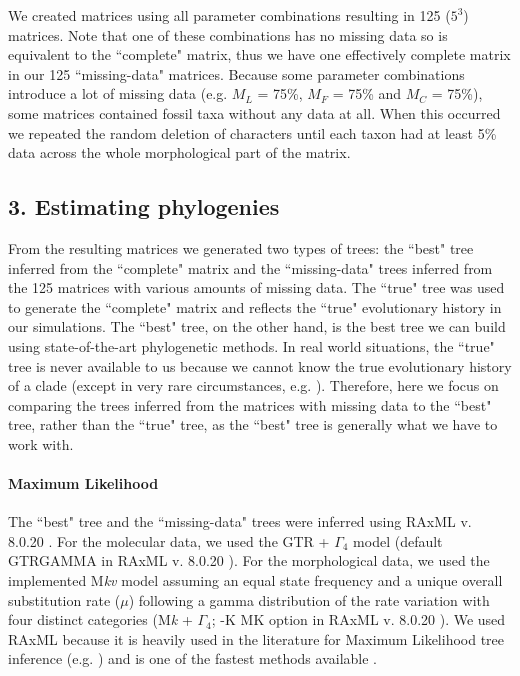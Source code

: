 \documentclass[10pt,letterpaper]{article}
\begin{document}
We created matrices using all parameter combinations resulting in 125 ($5^3$) matrices. Note that one of these combinations has no missing data so is equivalent to the ``complete" matrix, thus we have one effectively complete matrix in our 125 ``missing-data" matrices. Because some parameter combinations introduce a lot of missing data (e.g. $M_L$ = 75\%, $M_F$ = 75\% and $M_C$ = 75\%), some matrices contained fossil taxa without any data at all. When this occurred we repeated the random deletion of characters until each taxon had at least 5\% data across the whole morphological part of the matrix.


\subsection*{3. Estimating phylogenies}
From the resulting matrices we generated two types of trees: the ``best" tree inferred from the ``complete" matrix and the ``missing-data" trees inferred from the 125 matrices with various amounts of missing data. The ``true" tree was used to generate the ``complete" matrix and reflects the ``true" evolutionary history in our simulations. The ``best" tree, on the other hand, is the best tree we can build using state-of-the-art phylogenetic methods. In real world situations, the ``true" tree is never available to us because we cannot know the true evolutionary history of a clade (except in very rare circumstances, e.g. \cite{rozen2005}). Therefore, here we focus on comparing the trees inferred from the matrices with missing data to the ``best" tree, rather than the ``true" tree, as the ``best" tree is generally what we have to work with.

\paragraph*{Maximum Likelihood}
The ``best" tree and the ``missing-data" trees were inferred using RAxML v. 8.0.20 \cite{Stamatakis21012014}. For the molecular data, we used the GTR + $\Gamma_4$ model \cite{tavare1986} (default GTRGAMMA in RAxML v. 8.0.20  \cite{Stamatakis21012014}). For the morphological data, we used the implemented M\textit{kv} model \cite{lewisa2001} assuming an equal state frequency and a unique overall substitution rate ($\mu$) following a gamma distribution of the rate variation with four distinct categories (M\textit{k} + $\Gamma_4$; -K MK option in RAxML v. 8.0.20 \cite{Stamatakis21012014}).
We used RAxML because it is heavily used in the literature for Maximum Likelihood tree inference (e.g. \cite{rouresite-specific2011,Bogdanowicz2012,springermacroevolutionary2012,O'Leary08022013,kellymolecular2014}) and is one of the fastest methods available \cite{Stamatakis01102008}. 
\end{document}
